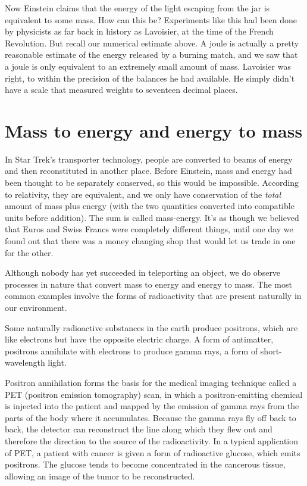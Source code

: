 Now Einstein claims that the energy of the light escaping from the jar is equivalent to some mass.
How can this be? Experiments like this had been done by physicists as far back in history as Lavoisier, at the time of
the French Revolution. But recall our numerical estimate above. A joule is actually a pretty reasonable
estimate of the energy released by a burning match, and we saw that a joule is only equivalent to an
extremely small amount of mass. Lavoisier was right, to within the precision of the balances he had available.
He simply didn't have a scale that measured weights to seventeen decimal places.

\section{Mass to energy and energy to mass}

In Star Trek's transporter technology, people are converted to beams of energy and then
reconstituted in another place. Before Einstein, mass and energy had been thought to be
separately conserved, so this would be impossible. According to relativity, they are
equivalent, and we only have conservation of
the \emph{total} amount of mass plus energy (with the two quantities converted into compatible
units before addition). The sum is called mass-energy. It's as though we believed that Euros
and Swiss Francs were completely different things, until one day we found out that there was
a money changing shop that would let us trade in one for the other.

Although nobody has yet succeeded in teleporting an object, we do observe processes in nature
that convert mass to energy and energy to mass. The most common examples involve the forms
of radioactivity that are present naturally in our environment.

Some naturally radioactive substances in the earth produce positrons, which are like electrons
but have the opposite electric charge.
A form of antimatter, positrons annihilate with electrons to produce gamma
rays, a form of short-wavelength light.


Positron annihilation forms the basis for the medical imaging technique called
a PET (positron emission tomography) scan, in which a positron-emitting chemical
is injected into the patient and mapped by the emission of gamma rays from the parts
of the body where it accumulates. Because the gamma rays fly off back to back, the detector
can reconstruct the line along which they flew out and therefore the direction to the source
of the radioactivity. In a typical application of PET, a patient with cancer is given
a form of radioactive glucose, which emits positrons. The glucose tends to become concentrated
in the cancerous tissue, allowing an image of the tumor to be reconstructed.

